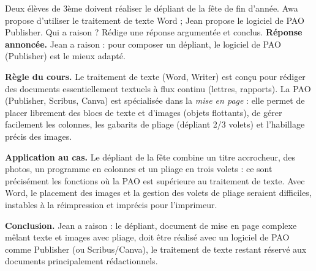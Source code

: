 \documentclass[11pt]{article}
\begin{document}
\begin{exoresolu}
Deux élèves de 3ème doivent réaliser le dépliant de la fête de fin d'année. Awa propose d'utiliser le traitement de texte Word ; Jean propose le logiciel de PAO Publisher. Qui a raison ? Rédige une réponse argumentée et conclus.
\tcblower
\textbf{Réponse annoncée.} Jean a raison : pour composer un dépliant, le logiciel de PAO (Publisher) est le mieux adapté.

\textbf{Règle du cours.} Le traitement de texte (Word, Writer) est conçu pour rédiger des documents essentiellement textuels à flux continu (lettres, rapports). La PAO (Publisher, Scribus, Canva) est spécialisée dans la \emph{mise en page} : elle permet de placer librement des blocs de texte et d'images (objets flottants), de gérer facilement les colonnes, les gabarits de pliage (dépliant 2/3 volets) et l'habillage précis des images.

\textbf{Application au cas.} Le dépliant de la fête combine un titre accrocheur, des photos, un programme en colonnes et un pliage en trois volets : ce sont précisément les fonctions où la PAO est supérieure au traitement de texte. Avec Word, le placement des images et la gestion des volets de pliage seraient difficiles, instables à la réimpression et imprécis pour l'imprimeur.

\textbf{Conclusion.} Jean a raison : le dépliant, document de mise en page complexe mêlant texte et images avec pliage, doit être réalisé avec un logiciel de PAO comme Publisher (ou Scribus/Canva), le traitement de texte restant réservé aux documents principalement rédactionnels.
\end{exoresolu}
\end{document}
